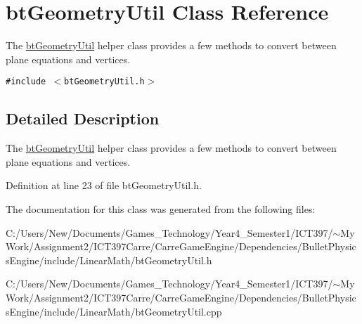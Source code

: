 \hypertarget{classbt_geometry_util}{
\section{btGeometryUtil Class Reference}
\label{classbt_geometry_util}
}
The \hyperlink{classbt_geometry_util}{btGeometryUtil} helper class provides a few methods to convert between plane equations and vertices.  


{\tt \#include $<$btGeometryUtil.h$>$}



\subsection{Detailed Description}
The \hyperlink{classbt_geometry_util}{btGeometryUtil} helper class provides a few methods to convert between plane equations and vertices. 

Definition at line 23 of file btGeometryUtil.h.

The documentation for this class was generated from the following files:\begin{CompactItemize}
\item 
C:/Users/New/Documents/Games\_\-Technology/Year4\_\-Semester1/ICT397/$\sim$My Work/Assignment2/ICT397Carre/CarreGameEngine/Dependencies/BulletPhysicsEngine/include/LinearMath/btGeometryUtil.h\item 
C:/Users/New/Documents/Games\_\-Technology/Year4\_\-Semester1/ICT397/$\sim$My Work/Assignment2/ICT397Carre/CarreGameEngine/Dependencies/BulletPhysicsEngine/include/LinearMath/btGeometryUtil.cpp\end{CompactItemize}
